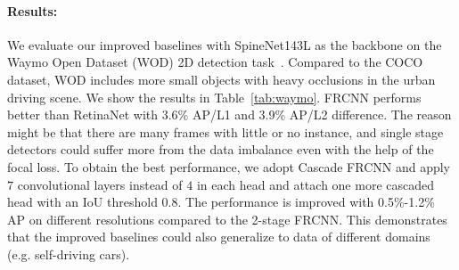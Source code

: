 \documentclass[final]{cvpr}
\begin{document}
\paragraph{Results:}
We evaluate our improved baselines with SpineNet143L as the backbone on the Waymo Open Dataset (WOD) 2D detection task~\cite{waymo_open_dataset}. Compared to the COCO dataset, WOD includes more small objects with heavy occlusions in the urban driving scene. We show the results in Table~\ref{tab:waymo}. FRCNN performs better than RetinaNet with 3.6\% AP/L1 and 3.9\% AP/L2 difference. The reason might be that there are many frames with little or no instance, and single stage detectors could suffer more from the data imbalance even with the help of the focal loss. To obtain the best performance, we adopt Cascade FRCNN and apply $7$ convolutional layers instead of $4$ in each head and attach one more cascaded head with an IoU threshold $0.8$. The performance is improved with 0.5\%-1.2\% AP on different resolutions compared to the 2-stage FRCNN. This demonstrates that the improved baselines could also generalize to data of different domains (e.g. self-driving cars).




{\small


}
\end{document}
